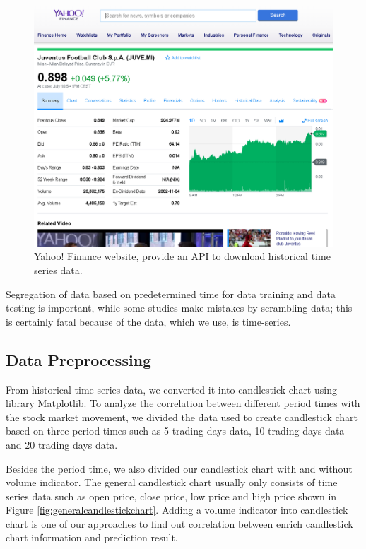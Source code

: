 \documentclass[10pt,twocolumn]{article}
\begin{document}
\begin{figure}
  \includegraphics[width=\linewidth]{figures/juvemarket.png}
  \caption{Yahoo! Finance website, provide an API to download historical time series data.}
  \label{fig:juvemarket}
\end{figure}
\par
Segregation of data based on predetermined time for data training and data testing is important, while some studies make mistakes by scrambling data; this is certainly fatal because of the data, which we use, is time-series.

\subsection{Data Preprocessing}
From historical time series data, we converted it into candlestick chart using library Matplotlib\cite{hunter2007matplotlib}. To analyze the correlation between different period times with the stock market movement, we divided the data used to create candlestick chart based on three period times such as 5 trading days data, 10 trading days data and 20 trading days data.
\par
Besides the period time, we also divided our candlestick chart with and without volume indicator. The general candlestick chart usually only consists of time series data such as open price, close price, low price and high price shown in Figure \ref{fig:generalcandlestickchart}. Adding a volume indicator into candlestick chart is one of our approaches to find out correlation between enrich candlestick chart information and prediction result.
\end{document}
